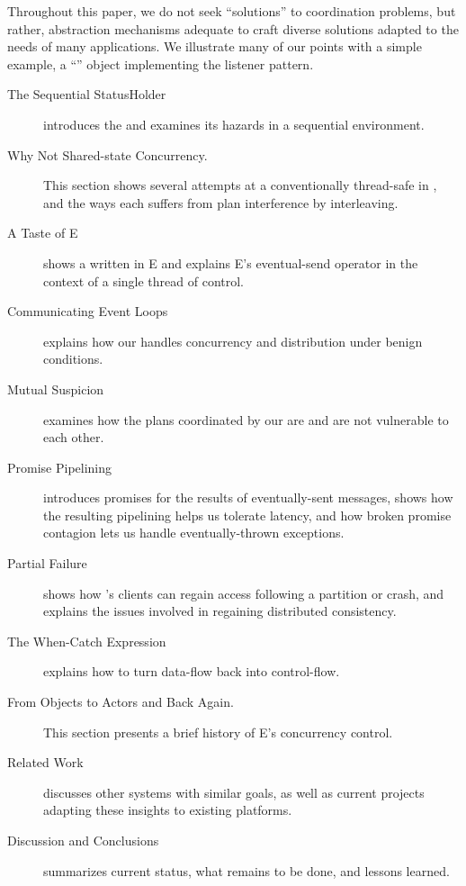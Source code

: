 \documentclass{llncs}
\begin{document}
Throughout this paper, we do not seek ``solutions'' to coordination
problems, but rather, abstraction mechanisms adequate to craft diverse
solutions adapted to the needs of many applications. We illustrate
many of our points with a simple example, a ``''
object implementing the listener pattern.
%
\begin{description}
\item[The Sequential StatusHolder] introduces the 
and examines its hazards in a sequential environment.

\item[Why Not Shared-state Concurrency.] This section shows several
attempts at a conventionally thread-safe  in
, and the ways each suffers from plan interference by
interleaving.

\item[A Taste of E] shows a  written in E and explains
E's eventual-send operator in the context of a single thread of
control.

\item[Communicating Event Loops] explains how our 
handles concurrency and distribution under benign conditions.

\item[Mutual Suspicion] examines how the plans coordinated by our
 are and are not vulnerable to each other.

\item[Promise Pipelining] introduces promises for the results of
eventually-sent messages, shows how the resulting pipelining helps us
tolerate latency, and how broken promise contagion lets us handle
eventually-thrown exceptions.

\item[Partial Failure] shows how 's clients can
regain access following a partition or crash, and explains the issues
involved in regaining distributed consistency.

\item[The When-Catch Expression] explains how to turn data-flow back
into control-flow.

\item[From Objects to Actors and Back Again.] This section presents a
brief history of E's concurrency control.

\item[Related Work] discusses other systems with similar goals, as
well as current projects adapting these insights to existing
platforms.

\item[Discussion and Conclusions] summarizes current status, what
remains to be done, and lessons learned. 

\end{description}
\end{document}
